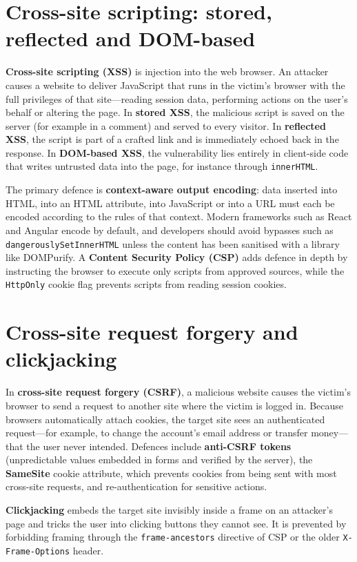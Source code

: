 \documentclass[11pt,openany]{book}
\begin{document}
\section{Cross-site scripting: stored, reflected and DOM-based}\label{sec:9.3}
\textbf{Cross-site scripting (XSS)} is injection into the web browser. An attacker causes a website to deliver JavaScript that runs in the victim's browser with the full privileges of that site—reading session data, performing actions on the user's behalf or altering the page. In \textbf{stored XSS}, the malicious script is saved on the server (for example in a comment) and served to every visitor. In \textbf{reflected XSS}, the script is part of a crafted link and is immediately echoed back in the response. In \textbf{DOM-based XSS}, the vulnerability lies entirely in client-side code that writes untrusted data into the page, for instance through \texttt{innerHTML}.

The primary defence is \textbf{context-aware output encoding}: data inserted into HTML, into an HTML attribute, into JavaScript or into a URL must each be encoded according to the rules of that context. Modern frameworks such as React and Angular encode by default, and developers should avoid bypasses such as \texttt{dangerouslySetInnerHTML} unless the content has been sanitised with a library like DOMPurify. A \textbf{Content Security Policy (CSP)} adds defence in depth by instructing the browser to execute only scripts from approved sources, while the \texttt{HttpOnly} cookie flag prevents scripts from reading session cookies.

\section{Cross-site request forgery and clickjacking}\label{sec:9.4}
In \textbf{cross-site request forgery (CSRF)}, a malicious website causes the victim's browser to send a request to another site where the victim is logged in. Because browsers automatically attach cookies, the target site sees an authenticated request—for example, to change the account's email address or transfer money—that the user never intended. Defences include \textbf{anti-CSRF tokens} (unpredictable values embedded in forms and verified by the server), the \textbf{SameSite} cookie attribute, which prevents cookies from being sent with most cross-site requests, and re-authentication for sensitive actions.

\textbf{Clickjacking} embeds the target site invisibly inside a frame on an attacker's page and tricks the user into clicking buttons they cannot see. It is prevented by forbidding framing through the \texttt{frame-ancestors} directive of CSP or the older \texttt{X-Frame-Options} header.
\end{document}

